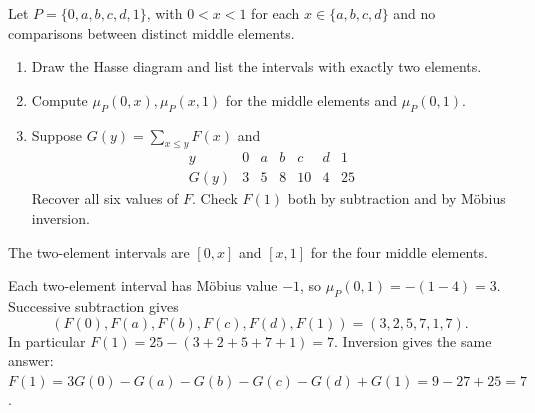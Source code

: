Let $P=\{0,a,b,c,d,1\}$, with $0<x<1$ for each
$x\in\{a,b,c,d\}$ and no comparisons between distinct middle elements.
\begin{enumerate}
 \item Draw the Hasse diagram and list the intervals with exactly two
 elements. 
 \item Compute $\mu_P(0,x),\mu_P(x,1)$ for the middle elements and
 $\mu_P(0,1)$. 
 \item Suppose $G(y)=\sum_{x\le y}F(x)$ and
 \[
 \begin{array}{c|rrrrrr}
 y&0&a&b&c&d&1\\\hline
 G(y)&3&5&8&10&4&25
 \end{array}
 \]
 Recover all six values of $F$. Check $F(1)$ both by subtraction and
 by M\"obius inversion. 
\end{enumerate}
\begin{solution}
The two-element intervals are $[0,x]$ and $[x,1]$ for the four middle elements.
\begin{center}
\end{center}
Each two-element interval has M\"obius value $-1$, so
$\mu_P(0,1)=-(1-4)=3$. Successive subtraction gives
\[
 (F(0),F(a),F(b),F(c),F(d),F(1))=(3,2,5,7,1,7).
\]
In particular $F(1)=25-(3+2+5+7+1)=7$. Inversion gives the same answer:
$F(1)=3G(0)-G(a)-G(b)-G(c)-G(d)+G(1)=9-27+25=7$.
\end{solution}

